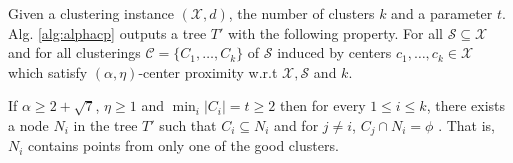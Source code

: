 \documentclass[11pt]{article}
\newcommand{\mc}{\mathcal}
\begin{document}
\begin{theorem}
\label{thm:alphacpnoise}
Given a clustering instance $(\mc X, d)$, the number of clusters $k$ and a parameter $t$. Alg. \ref{alg:alphacp} outputs a tree $T'$ with the following property. For all $\mc S \subseteq \mc X$ and for all clusterings $\mc C = \{C_1, \ldots, C_k\}$ of $\mc S$ induced by centers $c_1, \ldots, c_k \in \mc X$ which satisfy $(\alpha, \eta)$-center proximity w.r.t $\mc X, \mc S$ and $k$. 

If $\alpha \ge 2 + \sqrt 7$, $\eta \ge 1$ and $ \min_i|C_i| = t \ge 2$ then for every $1\le i \le k$, there exists a node $N_i$ in the tree $T'$ such that $C_i \subseteq N_i$ and for $j \neq i$, $C_j \cap N_i = \phi$ . That is, $N_i$ contains points from only one of the good clusters.
\end{theorem}
\end{document}
